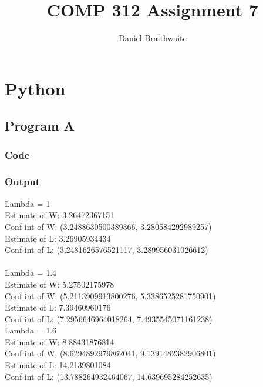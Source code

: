 \documentclass{article}
\title{COMP 312 Assignment 7}
\author{Daniel Braithwaite}
\begin{document}
	\maketitle
	\newpage
  	
  	\section{Python}
  		\subsection{Program A}
			\subsubsection{Code}
				
			\subsubsection{Output}
				Lambda = 1\\
				Estimate of W: 3.26472367151\\
Conf int of W: (3.2488630500389366, 3.280584292989257)\\

Estimate of L: 3.26905934434\\
Conf int of L: (3.2481626576521117, 3.289956031026612)\\\\

				Lambda = 1.4\\
				Estimate of W: 5.27502175978\\
Conf int of W: (5.2113909913800276, 5.3386525281750901)\\

Estimate of L: 7.39460960176\\
Conf int of L: (7.2956646964018264, 7.4935545071161238)\\
				
				Lambda = 1.6\\
				Estimate of W: 8.88431876814\\
Conf int of W: (8.6294892979862041, 9.1391482382906801)\\

Estimate of L: 14.2139801084\\
Conf int of L: (13.788264932464067, 14.639695284252635)\\\\
\end{document}
